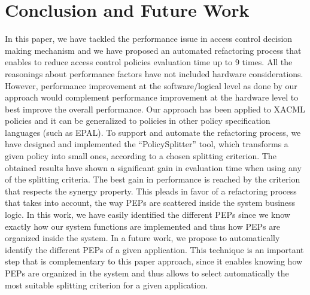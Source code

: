 \section{Conclusion and Future Work} \label{sec:conclusion}

In this paper, we have tackled the performance issue in access control decision making mechanism 
and we have proposed an automated refactoring process that enables to reduce access control policies evaluation time up to 9 times. 
All the reasonings about performance factors have not included hardware considerations. However, performance improvement at 
the software/logical level as done by our approach would complement performance improvement at the hardware level to best improve the overall performance. 
Our approach has been applied to XACML policies and it can be generalized to policies in other policy specification
languages (such as EPAL). 
To support and automate the refactoring process, we have designed and implemented the ``PolicySplitter'' tool,
which transforms a given policy into small ones, according to a chosen splitting criterion.
The obtained results have shown a significant gain in evaluation time when using any of the splitting criteria.
 The best gain in performance is reached by the criterion that respects the synergy property. This pleads in favor of a refactoring process that takes into
 account, the way PEPs are scattered inside the system business logic. 
In this work, we have easily identified the different PEPs since we know exactly how our system functions are
 implemented and thus how PEPs are organized inside the system. In a future work, we propose to automatically identify the different PEPs of a given application. 
This technique is an important step that is complementary to this paper approach, since it enables
 knowing how PEPs are organized in the system and thus allows to select automatically the most 
suitable splitting criterion for a given application. 